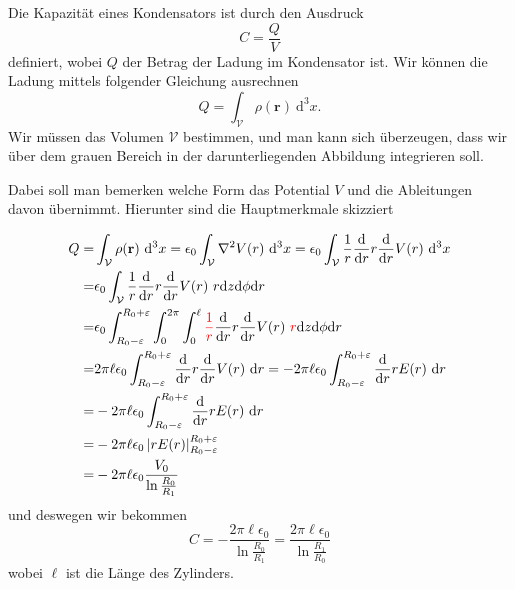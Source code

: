 \documentclass[A4paper, 12pt]{amsart}
\begin{document}
Die Kapazität eines Kondensators ist durch den Ausdruck
%
\begin{equation*}
  C = \frac{Q}{V}
\end{equation*}
%
definiert, wobei $ Q $ der Betrag der Ladung im Kondensator ist.
Wir können die Ladung mittels folgender Gleichung ausrechnen
%
\begin{equation*}
  Q =
  \int_{\mathcal V}
    \rho (\mathbf{r})
  \ \mathrm{d}^{3}x
  .
\end{equation*}
%
Wir müssen das Volumen $ \mathcal V $ bestimmen, und man kann sich überzeugen,
dass wir über dem grauen Bereich in der darunterliegenden Abbildung
integrieren soll.
\begin{center}
  
\end{center}

Dabei soll man bemerken welche Form das Potential $ V $ und die Ableitungen
davon übernimmt. Hierunter sind die Hauptmerkmale skizziert
\begin{center}
  
\end{center}
%
\begin{align*}
  Q = &
  \int_{\mathcal V}
    \rho (\mathbf{r})
  \ \mathrm{d}^{3}x
  =
  \epsilon_{0}
  \int_{\mathcal V}
    \nabla^{2}
    V(r)
  \ \mathrm{d}^{3}x
  =
  \epsilon_{0}
  \int_{\mathcal V}
    \frac{1}{r}
    \frac{\mathrm{d}}{\mathrm{d}r}
    r
    \frac{\mathrm{d}}{\mathrm{d}r}
    V(r)
  \ \mathrm{d}^{3}x
  \\
  =&
  \epsilon_{0}
  \int_{\mathcal V}
    \frac{1}{r}
    \frac{\mathrm{d}}{\mathrm{d}r}
    r
    \frac{\mathrm{d}}{\mathrm{d}r}
    V(r)
  \
  r
  \mathrm{d}z
  \mathrm{d}\phi
  \mathrm{d}r
  \\
  =&
  \epsilon_{0}
  \int_{R_{0} - \varepsilon}^{R_{0} + \varepsilon}
  \int_{0}^{2\pi}
  \int_{0}^{\ell}
    {\color{red}\frac{1}{r} }
    \frac{\mathrm{d}}{\mathrm{d}r}
    r
    \frac{\mathrm{d}}{\mathrm{d}r}
    V(r)
  \
  {\color{red}r }
  \mathrm{d}z
  \mathrm{d}\phi
  \mathrm{d}r
  \\
  =&
  2\pi\ell
  \epsilon_{0}
  \int_{R_{0} - \varepsilon}^{R_{0} + \varepsilon}
    \frac{\mathrm{d}}{\mathrm{d}r}
    r
    \frac{\mathrm{d}}{\mathrm{d}r}
    V(r)
  \
  \mathrm{d}r
  =
  -
  2\pi\ell
  \epsilon_{0}
  \int_{R_{0} - \varepsilon}^{R_{0} + \varepsilon}
    \frac{\mathrm{d}}{\mathrm{d}r}
    r
    E(r)
  \
  \mathrm{d}r
  \\
  =&
  -
  2\pi\ell
  \epsilon_{0}
  \int_{R_{0} - \varepsilon}^{R_{0} + \varepsilon}
    \frac{\mathrm{d}}{\mathrm{d}r}
    r
    E(r)
  \
  \mathrm{d}r
  \\
  =&
  -
  2\pi\ell
  \epsilon_{0}
  \left|
    r
    E(r)
  \right|_{R_{0} - \varepsilon}^{R_{0} + \varepsilon}
  \\
  =&
  -
  2\pi\ell
  \epsilon_{0}
  \frac{V_{0}}{\ln \frac{R_{0}}{R_{1}}}
\end{align*}
%
und deswegen wir bekommen
%
\[
  C =
  -
  \frac{2\pi\ell\epsilon_{0}}{\ln \frac{R_{0}}{R_{1}}}
  =
  \frac{2\pi\ell\epsilon_{0}}{\ln \frac{R_{1}}{R_{0}}}
\]
%
wobei $ \ell $ ist die Länge des Zylinders.
\end{document}

